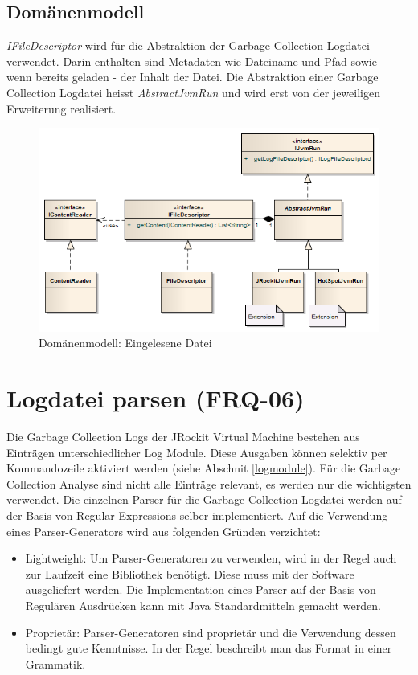 \subsection{Domänenmodell}
\textit{IFileDescriptor} wird für die Abstraktion der Garbage Collection Logdatei verwendet. Darin enthalten sind Metadaten wie Dateiname und Pfad sowie - wenn bereits geladen - der Inhalt der Datei. Die Abstraktion einer Garbage Collection Logdatei heisst \textit{AbstractJvmRun} und wird erst von der jeweiligen Erweiterung realisiert.
 \begin{figure}[H]
  	\centering
    	\includegraphics[width=16cm]{images/core_domain}
        	\caption{Domänenmodell: Eingelesene Datei}
\end{figure}

\section{Logdatei parsen (FRQ-06)}
Die Garbage Collection Logs der JRockit Virtual Machine bestehen aus Einträgen unterschiedlicher Log Module. Diese Ausgaben können selektiv per Kommandozeile aktiviert werden (siehe Abschnit \ref{logmodule}). Für die Garbage Collection Analyse sind nicht alle Einträge relevant, es werden nur die wichtigsten verwendet. Die einzelnen Parser für die Garbage Collection Logdatei werden auf der Basis von Regular Expressions selber implementiert. Auf die Verwendung eines Parser-Generators wird aus folgenden Gründen verzichtet:
\begin{itemize}
	\item Lightweight: Um Parser-Generatoren zu verwenden, wird in der Regel auch zur Laufzeit eine Bibliothek benötigt. Diese muss mit der Software ausgeliefert werden. Die Implementation eines Parser auf der Basis von Regulären Ausdrücken kann mit Java Standardmitteln gemacht werden.
	\item Proprietär: Parser-Generatoren sind proprietär und die Verwendung dessen bedingt gute Kenntnisse. In der Regel beschreibt man das Format in einer Grammatik.
\end{itemize}


